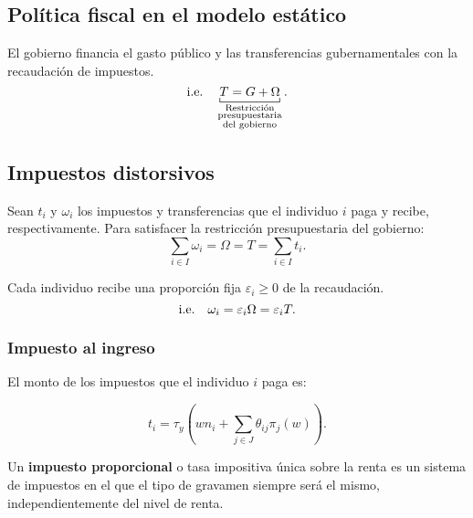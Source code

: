 \documentclass[8pt,a4paper]{extarticle}
\begin{document}
\begin{multicols}{3}
	\sectionbreak

	\section{Política fiscal en el modelo estático}

	\begin{boxrmk}[]
		El gobierno financia el gasto público y las transferencias gubernamentales con la recaudación de impuestos.
		\[
			\ie \quad \underbracket[0.5pt]{ T = G + \Omega}_{\substack{\text{\normalfont Restricción} \\ \text{\normalfont presupuestaria} \\ \text{\normalfont del gobierno}}}
			.\]
	\end{boxrmk}

	\subsection{Impuestos distorsivos}

	\begin{boxprop}[]
		Sean $t_i$ y $\omega_i$ los impuestos y transferencias que el individuo $i$ paga y recibe, respectivamente. Para satisfacer la restricción presupuestaria del gobierno:
		\[
			\sum_{i \in I} \omega_i = \Omega = T = \sum_{i \in I} t_i
			.\]
	\end{boxprop}

	\begin{boxprop}[]
		Cada individuo recibe una proporción fija $\varepsilon_i \ge 0$ de la recaudación.
		\[
			\text{\normalfont i.e.} \quad \omega_i = \varepsilon_i\Omega = \varepsilon_i T
			.\]
	\end{boxprop}

	\subsubsection{Impuesto al ingreso}

	El monto de los impuestos que el individuo $i$ paga es:

	\[
		t_i = \tau_y \left( wn_i + \sum_{j \in J} \theta_{ij} \pi_j (w) \right)
		.\]

	\begin{boxdef}
		Un \textbf{impuesto proporcional} o tasa impositiva única sobre la renta es un sistema de impuestos en el que el tipo de gravamen siempre será el mismo, independientemente del nivel de renta.
	\end{boxdef}


\end{multicols}
\end{document}
